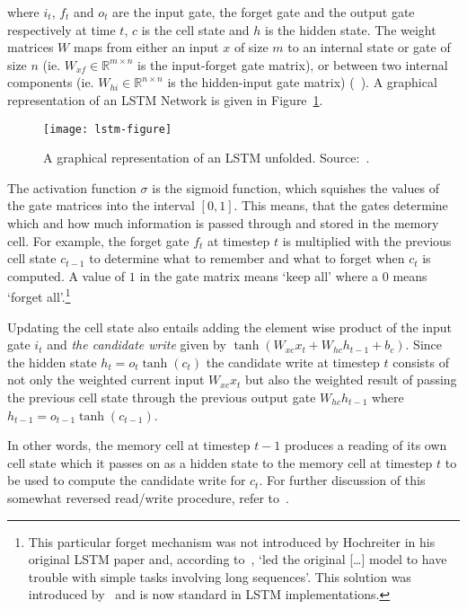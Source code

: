 where $i_{t}$, $f_{t}$ and $o_{t}$ are the input gate, the forget gate and the
output gate respectively at time $t$, $c$ is the cell state and $h$ is the
hidden state. The weight matrices $W$ maps from either an input $x$ of size $m$
to an internal state or gate of size $n$ (ie. $W_{xf} \in \mathbb{R}^{m \times n}$ is
the input-forget gate matrix), or between two internal components (ie. $W_{hi}
\in \mathbb{R}^{n \times n}$ is the hidden-input gate matrix)
(~\cite{huang2015bidirectional}). A graphical
representation of an LSTM Network is given in Figure~\ref{fig:lstm}.

\begin{figure}[h]
    \texttt{[image: lstm-figure]}
    \caption{A graphical representation of an LSTM unfolded. Source:~\cite{olah2015lstm}.
    }\label{fig:lstm}
\end{figure}

The activation function $\sigma$ is the sigmoid function, which squishes the
values of the gate matrices into the interval $[0,1]$. This means, that the
gates determine which and how much information is passed through and stored in
the memory cell. For example, the forget gate $f_{t}$ at timestep $t$ is
multiplied with the previous cell state $c_{t-1}$ to determine what to remember
and what to forget when $c_{t}$ is computed. A value of $1$ in the gate matrix
means `keep all' where a $0$ means `forget all'.\footnote{This particular forget
    mechanism was not introduced by Hochreiter in his original LSTM paper and,
    according to~\cite{pitis2016lstm}, `led the original [\ldots] model to have
    trouble with simple tasks involving long sequences'. This solution was
    introduced by~\cite{gers1999learning} and is now standard in LSTM
implementations.}

Updating the cell state also entails adding the element wise product of the
input gate $i_{t}$ and \textit{the candidate write} given by $\tanh(W_{xc}x_{t}
+ W_{hc}h_{t-1} + b_{c})$. Since the hidden state $h_{t} = o_{t}\tanh(c_{t})$
the candidate write at timestep $t$ consists of not only the weighted current
input $W_{xc}x_{t}$ but also the weighted result of passing the previous cell
state through the previous output gate $W_{hc}h_{t-1}$ where $h_{t-1} =
o_{t-1}\tanh(c_{t-1})$.

In other words, the memory cell at timestep $t-1$ produces a reading of its own
cell state which it passes on as a hidden state to the memory cell at timestep
$t$ to be used to compute the candidate write for $c_{t}$. For further
discussion of this somewhat reversed read/write procedure, refer
to~\cite{pitis2016lstm}.

